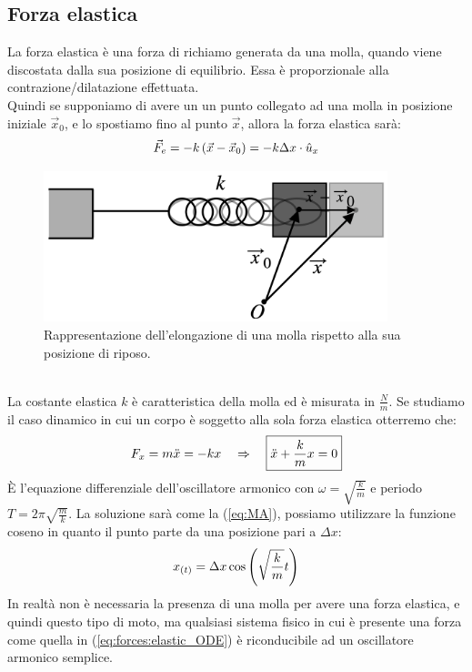 \subsection{Forza elastica}
La forza elastica è una forza di richiamo generata da una molla, quando viene
discostata dalla sua posizione di equilibrio. Essa è proporzionale alla
contrazione/dilatazione effettuata.\\ Quindi se supponiamo di avere un un
punto collegato ad una molla in posizione iniziale $\vec x_0$, e lo spostiamo
fino al punto $\vec x$, allora la forza elastica sarà:
\begin{equation}
    \vec F_e = -k\left(\vec x-\vec x_0\right) = -k\Delta x\cdot\hat u_x
\end{equation}
\begin{figure}[htbp]
    \begin{center}
        \includegraphics[width=10cm]{images/molla.png}
        \caption{Rappresentazione dell'elongazione di una molla rispetto
        alla sua posizione di riposo.}
\end{center}
\label{fig:forces:elastic}
\end{figure}
\\
La costante elastica $k$ è caratteristica della molla ed è misurata in
$\frac Nm$. Se studiamo il caso dinamico in cui un corpo è soggetto alla
sola forza elastica otterremo che:
\begin{equation}
    F_x = m\ddot x = -kx \quad\Rightarrow\quad \boxed{\ddot x +\frac km x = 0}
\label{eq:forces:elastic_ODE}
\end{equation}
È l'equazione differenziale dell'oscillatore armonico con
$\omega = \sqrt{\frac km}$ e periodo $T =2\pi\sqrt{\frac mk}$.
La soluzione sarà come la (\ref{eq:MA}), possiamo utilizzare la funzione
coseno in quanto il punto parte da una posizione pari a $\Delta x$:
\begin{equation}
    x_{(t)} = \Delta x \cos\left( \sqrt{\frac km}t\right)
\label{eq:forces:elastic_x}
\end{equation}
In realtà non è necessaria la presenza di una molla per avere una forza
elastica, e quindi questo tipo di moto, ma qualsiasi sistema fisico in cui è
presente una forza come quella in (\ref{eq:forces:elastic_ODE}) è
riconducibile ad un oscillatore armonico semplice.
